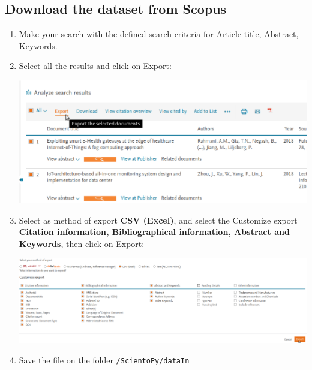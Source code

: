 \documentclass[10pt,letterpaper]{article}
\begin{document}
\subsection{Download the dataset from Scopus}
\begin{enumerate}
\item Make your search with the defined search criteria for Article title, Abstract, Keywords. 
\item Select all the results and click on Export:
	\begin{center}
		\includegraphics[scale=0.33]{./figures/scopus1.eps}
	\end{center}

\item Select as method of export \textbf{CSV (Excel)}, and select the Customize export \textbf{Citation information, Bibliographical information, Abstract and Keywords}, then click on Export: 
	\begin{center}
		\includegraphics[scale=0.3]{./figures/scopus2.eps}
	\end{center}

\item Save the file on the folder \verb|/ScientoPy/dataIn|
\end{enumerate}
\end{document}
